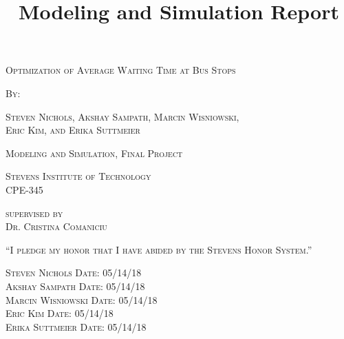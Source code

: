 \documentclass{article}
\begin{document}
\title{Modeling and Simulation Report}
\begin{titlepage}
    \centering
	{\scshape\LARGE Optimization of Average Waiting Time at Bus Stops \par}
	\vspace{.5cm}
    {\scshape By:\par}
	{\scshape Steven Nichols, Akshay Sampath, Marcin Wisniowski, \\
    Eric Kim, and Erika Suttmeier\par}
	\vfill
	{\scshape Modeling and Simulation, Final Project\par}
	\vspace{.5cm}
	{\scshape Stevens Institute of Technology\\CPE-345\par}
	\vspace{.5cm}
	{\scshape supervised by\\ Dr. Cristina Comaniciu\par}
    \vfill
	{\scshape“I pledge my honor that I have abided by the Stevens Honor System.”\par}
	\vspace{.5cm}
	{\scshape Steven Nichols \hfill Date: 05/14/18\\Akshay Sampath \hfill Date: 05/14/18\\Marcin Wisniowski \hfill Date: 05/14/18\\ Eric Kim \hfill Date: 05/14/18\\ Erika Suttmeier \hfill Date: 05/14/18\\}
	\vspace{3cm}
\end{titlepage}


\end{document}
